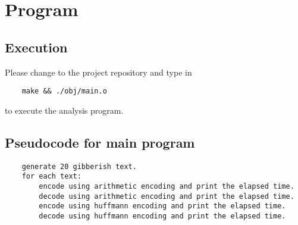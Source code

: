 	\section{Program}
	\subsection{Execution}
	Please change to the project repository and type in 
	\begin{lstlisting}
	make && ./obj/main.o
\end{lstlisting}
	to execute the analysis program.
	\subsection{Pseudocode for main program}
	\begin{lstlisting}
	generate 20 gibberish text.
	for each text:
	    encode using arithmetic encoding and print the elapsed time.
	    decode using arithmetic encoding and print the elapsed time.
	    encode using huffmann encoding and print the elapsed time.
	    decode using huffmann encoding and print the elapsed time.
\end{lstlisting}